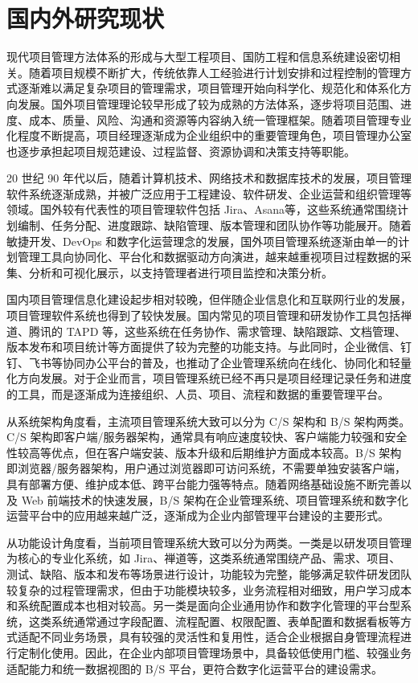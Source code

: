 \section{国内外研究现状}

现代项目管理方法体系的形成与大型工程项目、国防工程和信息系统建设密切相关。随着项目规模不断扩大，传统依靠人工经验进行计划安排和过程控制的管理方式逐渐难以满足复杂项目的管理需求，项目管理开始向科学化、规范化和体系化方向发展。国外项目管理理论较早形成了较为成熟的方法体系，逐步将项目范围、进度、成本、质量、风险、沟通和资源等内容纳入统一管理框架\cite{pmiPMBOK2025}。随着项目管理专业化程度不断提高，项目经理逐渐成为企业组织中的重要管理角色，项目管理办公室也逐步承担起项目规范建设、过程监督、资源协调和决策支持等职能。

20 世纪 90 年代以后，随着计算机技术、网络技术和数据库技术的发展，项目管理软件系统逐渐成熟，并被广泛应用于工程建设、软件研发、企业运营和组织管理等领域\cite{rebuglio2025pmis}。国外较有代表性的项目管理软件包括 Jira、Asana等\cite{atlassianJiraDocumentation,asanaDevelopersOverview}，这些系统通常围绕计划编制、任务分配、进度跟踪、缺陷管理、版本管理和团队协作等功能展开。随着敏捷开发、DevOps 和数字化运营理念的发展，国外项目管理系统逐渐由单一的计划管理工具向协同化、平台化和数据驱动方向演进，越来越重视项目过程数据的采集、分析和可视化展示，以支持管理者进行项目监控和决策分析\cite{googleDORA2024}。

国内项目管理信息化建设起步相对较晚，但伴随企业信息化和互联网行业的发展，项目管理软件系统也得到了较快发展。国内常见的项目管理和研发协作工具包括禅道、腾讯的 TAPD 等\cite{zentaoMaintainOrganizationDepartment,tapdOpenPlatformApiDoc}，这些系统在任务协作、需求管理、缺陷跟踪、文档管理、版本发布和项目统计等方面提供了较为完整的功能支持。与此同时，企业微信、钉钉、飞书等协同办公平台的普及，也推动了企业管理系统向在线化、协同化和轻量化方向发展。对于企业而言，项目管理系统已经不再只是项目经理记录任务和进度的工具，而是逐渐成为连接组织、人员、项目、流程和数据的重要管理平台。

从系统架构角度看，主流项目管理系统大致可以分为 C/S 架构和 B/S 架构两类\cite{iso42010_2022}。C/S 架构即客户端/服务器架构，通常具有响应速度较快、客户端能力较强和安全性较高等优点，但在客户端安装、版本升级和后期维护方面成本较高。B/S 架构即浏览器/服务器架构，用户通过浏览器即可访问系统，不需要单独安装客户端，具有部署方便、维护成本低、跨平台能力强等特点。随着网络基础设施不断完善以及 Web 前端技术的快速发展，B/S 架构在企业管理系统、项目管理系统和数字化运营平台中的应用越来越广泛，逐渐成为企业内部管理平台建设的主要形式。

从功能设计角度看，当前项目管理系统大致可以分为两类。一类是以研发项目管理为核心的专业化系统，如 Jira、禅道等，这类系统通常围绕产品、需求、项目、测试、缺陷、版本和发布等场景进行设计，功能较为完整，能够满足软件研发团队较复杂的过程管理需求，但由于功能模块较多，业务流程相对细致，用户学习成本和系统配置成本也相对较高。另一类是面向企业通用协作和数字化管理的平台型系统，这类系统通常通过字段配置、流程配置、权限配置、表单配置和数据看板等方式适配不同业务场景，具有较强的灵活性和复用性，适合企业根据自身管理流程进行定制化使用。因此，在企业内部项目管理场景中，具备较低使用门槛、较强业务适配能力和统一数据视图的 B/S 平台，更符合数字化运营平台的建设需求。

